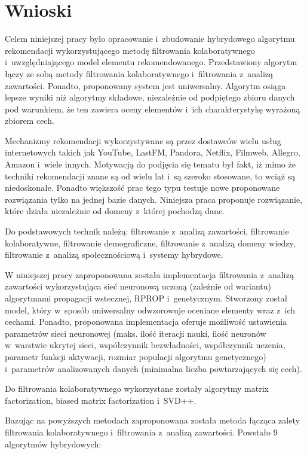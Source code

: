 \documentclass[twoside]{iisthesis}
\begin{document}
\chapter{Wnioski}

	Celem niniejszej pracy było opracowanie i~zbudowanie hybrydowego algorytmu rekomendacji wykorzystującego metodę filtrowania kolaboratywnego i~uwzględniającego model elementu rekomendowanego. Przedstawiony algorytm łączy ze sobą metody filtrowania kolaboratywnego i~filtrowania z~analizą zawartości. Ponadto, proponowany system jest uniwersalny. Algorytm osiąga lepsze wyniki niż algorytmy składowe, niezależnie od podpiętego zbioru danych pod warunkiem, że ten zawiera oceny elementów i~ich charakterystykę wyrażoną zbiorem cech.

	Mechanizmy rekomendacji wykorzystywane są przez dostawców wielu usług internetowych takich jak YouTube, LastFM, Pandora, Netflix, Filmweb, Allegro, Amazon i~wiele innych. Motywacją do podjęcia się tematu był fakt, iż mimo że techniki rekomendacji znane są od wielu lat i~są szeroko stosowane, to wciąż są niedoskonałe. Ponadto większość prac tego typu testuje nowe proponowane rozwiązania tylko na jednej bazie danych. Niniejsza praca proponuje rozwiązanie, które działa niezależnie od domeny z~której pochodzą dane.
	
	Do podstawowych technik należą: filtrowanie z~analizą zawartości, filtrowanie kolaboratywne, filtrowanie demograficzne, filtrowanie z~analizą domeny wiedzy, filtrowanie z~analizą społecznościową i~systemy hybrydowe. 
	
	W niniejszej pracy zaproponowana została implementacja filtrowania z~analizą zawartości wykorzystująca sieć neuronową uczoną (zależnie od wariantu) algorytmami propagacji wstecznej, RPROP i~genetycznym. Stworzony został model, który w~sposób uniwersalny odwzorowuje oceniane elementy wraz z~ich cechami. Ponadto, proponowana implementacja oferuje możliwość ustawienia parametrów sieci neuronowej (maks. ilość iteracji nauki, ilość neuronów w~warstwie ukrytej sieci, współczynnik bezwładności, współczynnik uczenia, parametr funkcji aktywacji, rozmiar populacji algorytmu genetycznego) i~parametrów analizowanych danych (minimalna liczba powtarzających się cech).
	
	Do filtrowania kolaboratywnego wykorzystane zostały algorytmy matrix factorization, biased matrix factorization i~SVD++.
	
	Bazując na powyższych metodach zaproponowana została metoda łącząca zalety filtrowania kolaboratywnego i~filtrowania z~analizą zawartości. Powstało 9 algorytmów hybrydowych: 
	
\end{document}
